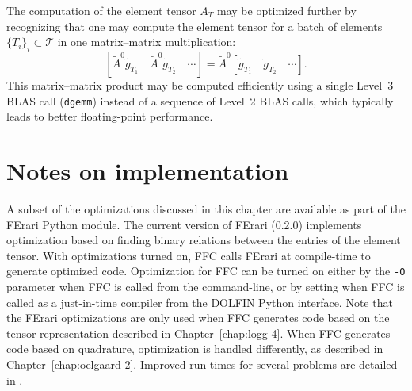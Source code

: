 The computation of the element tensor $A_T$ may be optimized further
by recognizing that one may compute the element tensor for a batch of
elements $\{T_i\}_i \subset \mathcal{T}$ in one matrix--matrix
multiplication:
\begin{equation}
  \left[\tilde{A}^0 \tilde{g}_{T_1} \quad \tilde{A}^0 \tilde{g}_{T_2} \quad \cdots \right] =
  \tilde{A}^0 \left[\tilde{g}_{T_1} \quad \tilde{g}_{T_2} \quad \cdots\right].
\end{equation}
This matrix--matrix product may be computed efficiently using a single
Level~3 BLAS call (\texttt{dgemm}) instead of a sequence of Level~2
BLAS calls, which typically leads to better floating-point
performance.

\section{Notes on implementation}

A subset of the optimizations discussed in this chapter are available
as part of the FErari Python module. The current version of FErari
(0.2.0) implements optimization based on finding binary relations
between the entries of the element tensor. With optimizations turned
on, FFC calls FErari at compile-time to generate optimized
code. Optimization for FFC can be turned on either by the \texttt{-O}
parameter when FFC is called from the command-line, or by setting
 when FFC is
called as a just-in-time compiler from the DOLFIN Python
interface. Note that the FErari optimizations are only used when FFC
generates code based on the tensor representation described in
Chapter~\ref{chap:logg-4}. When FFC generates code based on
quadrature, optimization is handled differently, as described in
Chapter~\ref{chap:oelgaard-2}.  Improved run-times for several
problems are detailed in \citet{KirbyLogg2008}.
